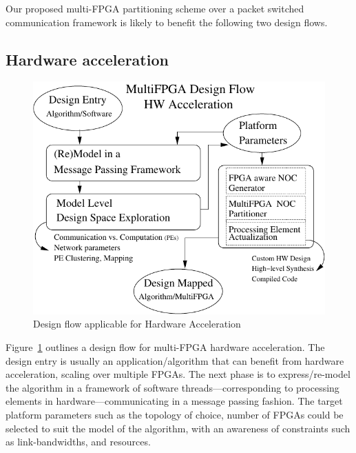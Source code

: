 \documentclass[conference, 9pt]{IEEEtran}
\begin{document}
Our proposed multi-FPGA partitioning scheme over a packet switched communication framework is likely to benefit the following
two design flows.

\subsection{Hardware acceleration}
\begin{figure}[htpb!]
\centering
\includegraphics[scale=0.65]{xfig/hpcDesFlow.pdf}
\caption{Design flow applicable for Hardware Acceleration}
\label{fig:hpcDesFlow}
\end{figure}
Figure~\ref{fig:hpcDesFlow} outlines a design flow for multi-FPGA hardware acceleration.
The design entry is usually an application/algorithm that can benefit from hardware acceleration, scaling over multiple FPGAs. The next phase is to express/re-model the algorithm
in a framework of software threads---corresponding to processing elements in hardware---communicating in a message passing fashion.
The target platform parameters such as the topology of choice, number of FPGAs could be selected to suit the model of the algorithm, with an awareness of constraints such as link-bandwidths, and resources.
 
\end{document}
